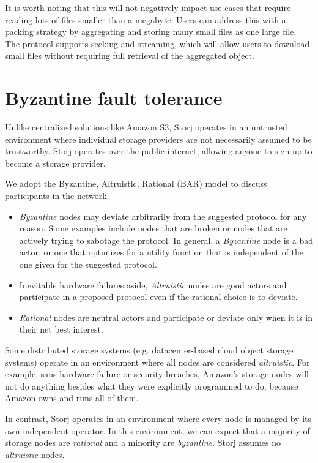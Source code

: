 \documentclass[8pt,fleqn,openany]{book}
\begin{document}
It is worth noting that this will not negatively impact use cases that
require reading lots of files smaller than a megabyte. Users can address this
with a packing strategy by aggregating and storing many small files as one
large file.
The protocol supports seeking and streaming, which will allow users to download small files
without requiring full retrieval of the aggregated object.

\section{Byzantine fault tolerance}

Unlike centralized solutions like Amazon S3, Storj operates in an untrusted
environment where individual storage providers are not necessarily assumed to be
trustworthy. Storj operates over the public internet, allowing anyone to sign
up to become a storage provider.

We adopt the Byzantine, Altruistic, Rational (BAR) model \cite{bar} to discuss
participants in the network.

\begin{itemize}
\item {\em Byzantine} nodes may deviate arbitrarily from the suggested
  protocol for any reason. Some examples include nodes that are broken or nodes
  that are actively trying to sabotage the protocol. In general, a
  {\em Byzantine} node is a bad actor, or one that optimizes for a utility
  function that is independent of the one given for the suggested protocol.
\item Inevitable hardware failures aside, {\em Altruistic} nodes are good
  actors and participate in a proposed protocol even if the rational choice is
  to deviate.
\item {\em Rational} nodes are neutral actors and participate or deviate only
  when it is in their net best interest.
\end{itemize}

Some distributed storage systems (e.g. datacenter-based cloud object storage systems)
operate in an environment
where all nodes are considered {\em altruistic}. For example, sans hardware failure
or security breaches, Amazon's storage nodes
will not do anything besides what they were explicitly programmed to do,
because Amazon owns and runs all of them.

In contrast, Storj operates in an environment where every node is
managed by its own independent operator.
In this environment, we can expect that a majority
of storage nodes are {\em rational} and a minority are {\em byzantine}. Storj assumes no
{\em altruistic} nodes.
\end{document}
